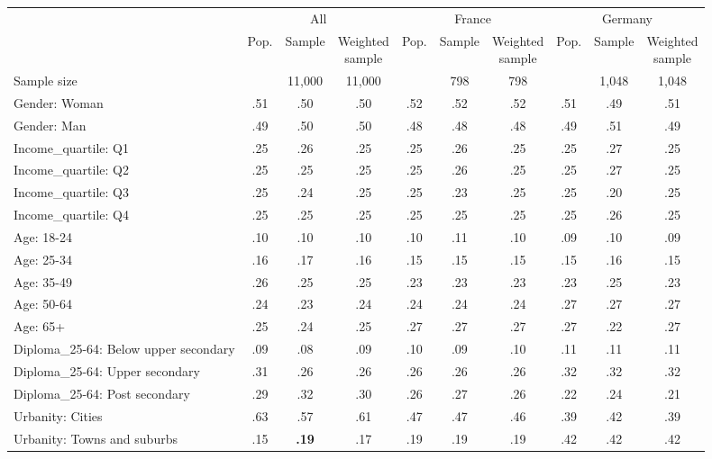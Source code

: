 
\begin{tabular}[t]{lccccccccc}
\toprule
\multicolumn{1}{c}{} & \multicolumn{3}{c}{All} & \multicolumn{3}{c}{France} & \multicolumn{3}{c}{Germany} \\
\cmidrule(l{3pt}r{3pt}){2-4} \cmidrule(l{3pt}r{3pt}){5-7} \cmidrule(l{3pt}r{3pt}){8-10}
  & Pop. & Sample & \makecell{Weighted\\sample} & Pop. & Sample & \makecell{Weighted\\sample} & Pop. & Sample & \makecell{Weighted\\sample}\\
\midrule
Sample size &  & 11,000 & 11,000 &  & 798 & 798 &  & 1,048 & 1,048\\
\addlinespace
Gender: Woman & .51 & .50 & .50 & .52 & .52 & .52 & .51 & .49 & .51\\
Gender: Man & .49 & .50 & .50 & .48 & .48 & .48 & .49 & .51 & .49\\
\addlinespace
Income\_quartile: Q1 & .25 & .26 & .25 & .25 & .26 & .25 & .25 & .27 & .25\\
Income\_quartile: Q2 & .25 & .25 & .25 & .25 & .26 & .25 & .25 & .27 & .25\\
Income\_quartile: Q3 & .25 & .24 & .25 & .25 & .23 & .25 & .25 & .20 & .25\\
Income\_quartile: Q4 & .25 & .25 & .25 & .25 & .25 & .25 & .25 & .26 & .25\\
\addlinespace
Age: 18-24 & .10 & .10 & .10 & .10 & .11 & .10 & .09 & .10 & .09\\
Age: 25-34 & .16 & .17 & .16 & .15 & .15 & .15 & .15 & .16 & .15\\
Age: 35-49 & .26 & .25 & .25 & .23 & .23 & .23 & .23 & .25 & .23\\
Age: 50-64 & .24 & .23 & .24 & .24 & .24 & .24 & .27 & .27 & .27\\
Age: 65+ & .25 & .24 & .25 & .27 & .27 & .27 & .27 & .22 & .27\\
\addlinespace
Diploma\_25-64: Below upper secondary & .09 & .08 & .09 & .10 & .09 & .10 & .11 & .11 & .11\\
Diploma\_25-64: Upper secondary & .31 & .26 & .26 & .26 & .26 & .26 & .32 & .32 & .32\\
Diploma\_25-64: Post secondary & .29 & .32 & .30 & .26 & .27 & .26 & .22 & .24 & .21\\
\addlinespace
Urbanity: Cities & .63 & .57 & .61 & .47 & .47 & .46 & .39 & .42 & .39\\
Urbanity: Towns and suburbs & .15 & \textbf{.19} & .17 & .19 & .19 & .19 & .42 & .42 & .42\\

\end{tabular}
